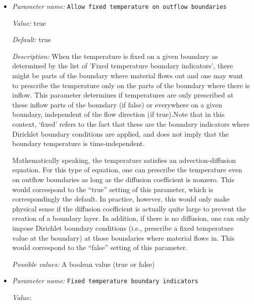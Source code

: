 \begin{itemize}
\item {\it Parameter name:} {\tt Allow fixed temperature on outflow boundaries}
\label{parameters:Boundary temperature model/Allow fixed temperature on outflow boundaries}


{\it Value:} true


{\it Default:} true


{\it Description:} When the temperature is fixed on a given boundary as determined by the list of 'Fixed temperature boundary indicators', there might be parts of the boundary where material flows out and one may want to prescribe the temperature only on the parts of the boundary where there is inflow. This parameter determines if temperatures are only prescribed at these inflow parts of the boundary (if false) or everywhere on a given boundary, independent of the flow direction (if true).Note that in this context, `fixed' refers to the fact that these are the boundary indicators where Dirichlet boundary conditions are applied, and does not imply that the boundary temperature is time-independent. 

Mathematically speaking, the temperature satisfies an advection-diffusion equation. For this type of equation, one can prescribe the temperature even on outflow boundaries as long as the diffusion coefficient is nonzero. This would correspond to the ``true'' setting of this parameter, which is correspondingly the default. In practice, however, this would only make physical sense if the diffusion coefficient is actually quite large to prevent the creation of a boundary layer. In addition, if there is no diffusion, one can only impose Dirichlet boundary conditions (i.e., prescribe a fixed temperature value at the boundary) at those boundaries where material flows in. This would correspond to the ``false'' setting of this parameter.


{\it Possible values:} A boolean value (true or false)
\item {\it Parameter name:} {\tt Fixed temperature boundary indicators}
\label{parameters:Boundary temperature model/Fixed temperature boundary indicators}


{\it Value:} 



\end{itemize}
